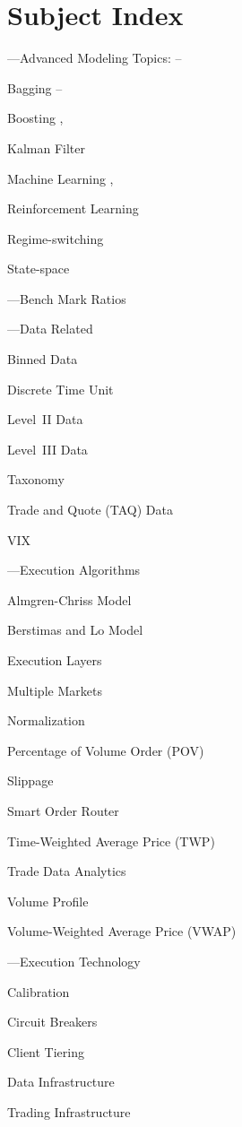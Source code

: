 \chapter*{Subject Index}
\nopagebreak

\begin{minipage}{0.40\textwidth}
\noindent ---Advanced Modeling Topics: \pageref{in:adv_model}--\pageref{in:adv_model_end}
	\begin{flushright}
	Bagging  \pageref{in:bagging}--\pageref{in:bagging_end} \par
	Boosting \pageref{in:boost1}, \pageref{in:boost2} \par
	Kalman Filter \pageref{in:kalman} \par
	Machine Learning \pageref{in:machine1}, \pageref{in:machine2} \par
	Reinforcement Learning \pageref{in:re_learning} \par
	Regime-switching \pageref{in:regime} \par
	State-space \pageref{in:state_space}
	\end{flushright}


\noindent ---Bench Mark Ratios \pageref{in:benchmark}


\noindent ---Data Related
	\begin{flushright}
	Binned Data \par
	Discrete Time Unit \par
	Level~II Data \par
	Level~III Data \par
	Taxonomy \par
	Trade and Quote (TAQ) Data \par 
	VIX
	\end{flushright}


\noindent ---Execution Algorithms
	\begin{flushright}
	Almgren-Chriss Model \par
	Berstimas and Lo Model \par
	Execution Layers \par
	Multiple Markets \par 
	Normalization \par
	Percentage of Volume Order (POV) \par
	Slippage \par
	Smart Order Router \par
	Time-Weighted Average Price (TWP) \par
	Trade Data Analytics \par
	Volume Profile \par
	Volume-Weighted Average Price (VWAP)
	\end{flushright}

\noindent ---Execution Technology
	\begin{flushright}
	Calibration \par
	Circuit Breakers \par
	Client Tiering \par
	Data Infrastructure \par
	Trading Infrastructure
	\end{flushright}
\vfill 
\end{minipage} \hfill
